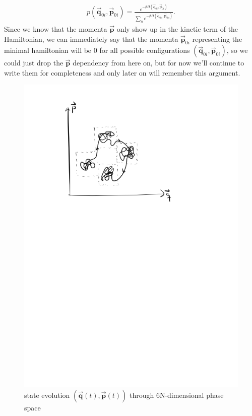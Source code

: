 \begin{align}
	p(\vec{\mathbf{q}}_{0i},\vec{\mathbf{p}}_{0i})=\frac{e^{-\beta H(\vec{\mathbf{q}}_{0i},\vec{\mathbf{p}}_{0i})}}{\sum_{n} e^{-\beta H(\vec{\mathbf{q}}_{0n},\vec{\mathbf{p}}_{0n})}}.
\end{align}
Since we know that the momenta $\vec{\mathbf{p}}$ only show up in the kinetic term of the Hamiltonian, we can immediately say that the momenta $\vec{\mathbf{p}}_{0i}$ representing the minimal hamiltonian will be 0 for all possible configurations $(\vec{\mathbf{q}}_{0i},\vec{\mathbf{p}}_{0i})$, so we could just drop the $\vec{\mathbf{p}}$ dependency from here on, but for now we'll continue to write them for completeness and only later on will remember this argument.

\begin{figure}
	\centering
	\includegraphics[trim=3cm 18cm 6cm 1.5cm, clip,scale=0.7]{./Inhalt/Bilder/phasespace.png}
	\caption{state evolution $(\vec{\mathbf{q}}(t),\vec{\mathbf{p}}(t))$ through 6N-dimensional phase space}
	\label{fig:phasepsace}
\end{figure}
